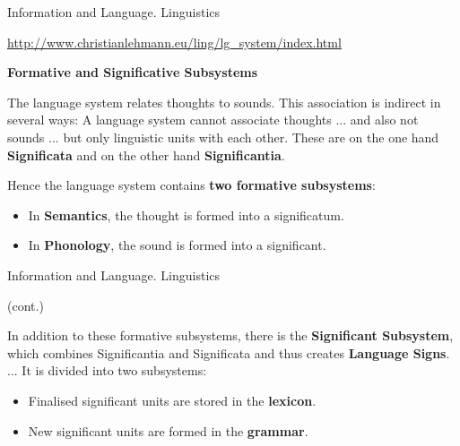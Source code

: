 \documentclass{beamer}
\newcommand{\ueberschrift}[1]{\begin{center}\bf #1\end{center}}
\begin{document}
\begin{frame}{Information and Language. Linguistics}\small
  
\url{http://www.christianlehmann.eu/ling/lg_system/index.html}

\ueberschrift{Formative and Significative Subsystems}

The language system relates thoughts to sounds. This association is indirect
in several ways: A language system cannot associate thoughts ... and also not
sounds ... but only linguistic units with each other. These are on the one
hand \textbf{Significata} and on the other hand \textbf{Significantia}.

Hence the language system contains \textbf{two formative subsystems}:
\begin{itemize}
\item In \textbf{Semantics}, the thought is formed into a significatum.
\item In \textbf{Phonology}, the sound is formed into a significant.
\end{itemize}
\end{frame}
\begin{frame}{Information and Language. Linguistics}\small
  
  (cont.)
  
In addition to these formative subsystems, there is the \textbf{Significant
  Subsystem}, which combines Significantia and Significata and thus creates
\textbf{Language Signs}. ... It is divided into two subsystems:
\begin{itemize}
\item Finalised significant units are stored in the \textbf{lexicon}.  
\item New significant units are formed in the \textbf{grammar}.
\end{itemize}
\end{frame}
\end{document}
